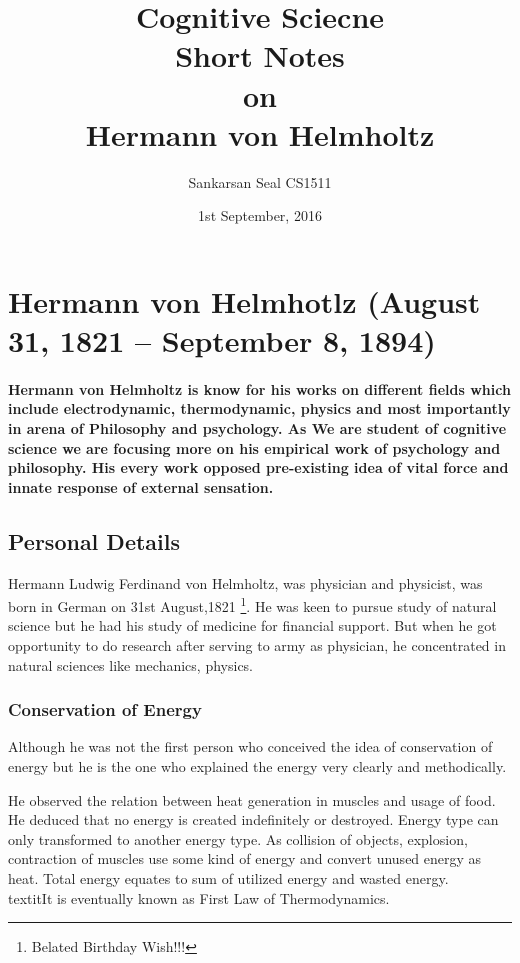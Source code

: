 \documentclass[11pt]{article}
\begin{document}
\title{Cognitive Sciecne\\ Short Notes\\ on\\ Hermann von Helmholtz}
\author{Sankarsan Seal CS1511}
\date{1st September, 2016}
\maketitle

\section{Hermann von Helmhotlz (August 31, 1821  – September 8, 1894)}
\paragraph{Hermann von Helmholtz is know for his works on different fields which include electrodynamic, thermodynamic, physics and most importantly in arena of Philosophy and psychology. As We are student of cognitive science we are focusing more on his empirical work of psychology and philosophy. His every work opposed pre-existing idea of vital force and innate response of external sensation.}

\subsection{Personal Details}
Hermann Ludwig Ferdinand von Helmholtz, was physician and physicist, was born in German on 31st August,1821 \footnote{Belated Birthday Wish!!!}. He was keen to pursue study of natural science but he had his study of medicine for financial support. But when he got opportunity to do research after serving to army as physician, he concentrated in natural sciences like mechanics, physics.

\subsubsection{Conservation of Energy}
Although he was not the first person who conceived the idea of conservation of energy but he is the one who explained the energy very clearly and methodically.

He observed the relation between heat generation in muscles and  usage of food. He deduced that no energy is created indefinitely or destroyed. Energy type can only transformed to another energy type. As collision of objects, explosion, contraction of muscles use some kind of energy and convert unused energy as heat. Total energy equates to  sum of utilized energy and wasted energy. \\textit{It is eventually known as First Law of Thermodynamics.}
\end{document}
